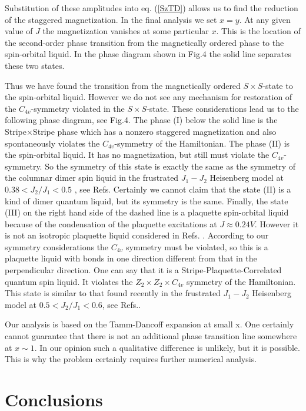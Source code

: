 Substitution of these amplitudes into eq. (\ref{SzTD}) allows us to find
the reduction of the staggered magnetization. In the final analysis
we set $x=y$. At any given value of $J$
the magnetization vanishes at some particular $x$. This is the location
of the second-order phase transition from the magnetically ordered
phase to the spin-orbital liquid.
In the phase diagram shown in Fig.4 the solid line separates 
these two states.

Thus we have found the transition from the magnetically ordered
$S \times S$-state to the spin-orbital liquid. However we do not see
any mechanism for restoration of the $C_{4v}$-symmetry
violated in the $S\times S$-state.
These considerations lead us to the following phase diagram, see Fig.4.
The phase (I) below the solid line is the Stripe$\times$Stripe phase
which has a nonzero staggered magnetization and also spontaneously 
violates the $C_{4v}$-symmetry of the Hamiltonian.
The phase (II) is the spin-orbital liquid. It has no magnetization,
but still must violate the $C_{4v}$-symmetry. So the symmetry of
this state is exactly the same as the symmetry of the columnar
dimer spin liquid in the frustrated $J_1-J_2$ Heisenberg model at
$0.38 < J_2/J_1 < 0.5$ , see Refs. \cite{Gelfand,Read,Croo,oleg}
Certainly we cannot claim that the state (II) is a kind of 
dimer quantum liquid, but its symmetry is the same.
Finally, the state (III) on the right hand side of the dashed line
is a plaquette spin-orbital liquid because of the condensation
of the plaquette excitations at $J\approx 0.24V$. However it is not
an isotropic plaquette liquid considered in 
Refs. \cite{su4swave2,su4calc}.
According to our symmetry considerations the $C_{4v}$ symmetry
must be violated, so this is a plaquette liquid with bonds in
one direction different from that in the perpendicular direction.
One can say that it is a  Stripe-Plaquette-Correlated
quantum spin liquid. It violates the $Z_2\times Z_2 \times C_{4v}$
symmetry of the Hamiltonian.
This state is similar to that found recently in the frustrated
$J_1-J_2$ Heisenberg model at $0.5 < J_2/J_1 < 0.6$, see 
Refs.\cite{Croo,oleg}.

Our analysis is based on the Tamm-Dancoff expansion at small x.
One certainly cannot guarantee that there is not an additional
phase transition line somewhere at $x\sim 1$. In our opinion
such a qualitative difference is unlikely, but it is possible.
This is why the problem certainly requires further numerical
analysis.

\section{Conclusions}

